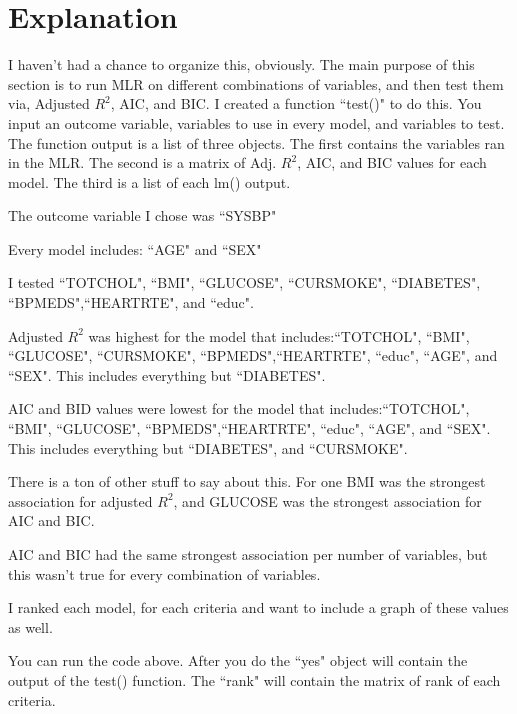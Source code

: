 \documentclass{article}\usepackage[]{graphicx}\usepackage[]{color}
\begin{document}
\section{Explanation}

I haven't had a chance to organize this, obviously.  The main purpose of this section is to run MLR on different combinations of variables, and then test them via, Adjusted $R^2$, AIC, and BIC. I created a function ``test()" to do this.  You input an outcome variable, variables to use in every model, and variables to test.  The function output is a list of three objects. The first contains the variables ran in the MLR. The second is a matrix of Adj. $R^2$, AIC, and BIC values for each model.  The third is a list of each lm() output.

The outcome variable I chose was ``SYSBP"

Every model includes: ``AGE" and ``SEX"

I tested ``TOTCHOL", ``BMI", ``GLUCOSE", ``CURSMOKE", ``DIABETES", ``BPMEDS",``HEARTRTE", and ``educ".

Adjusted $R^2$ was highest for the model that includes:``TOTCHOL", ``BMI", ``GLUCOSE", ``CURSMOKE", ``BPMEDS",``HEARTRTE", ``educ", ``AGE", and ``SEX". This includes everything but ``DIABETES".

AIC and BID values were lowest for the model that includes:``TOTCHOL", ``BMI", ``GLUCOSE", ``BPMEDS",``HEARTRTE", ``educ", ``AGE", and ``SEX". This includes everything but ``DIABETES", and ``CURSMOKE".

There is a ton of other stuff to say about this.  For one BMI was the strongest association for adjusted $R^2$, and GLUCOSE was the strongest association for AIC and BIC.

AIC and BIC had the same strongest association per number of variables, but this wasn't true for every combination of variables.

I ranked each model, for each criteria and want to include a graph of these values as well.

You can run the code above.  After you do the ``yes" object will contain the output of the test() function. The ``rank" will contain the matrix of rank of each criteria.
\end{document}
